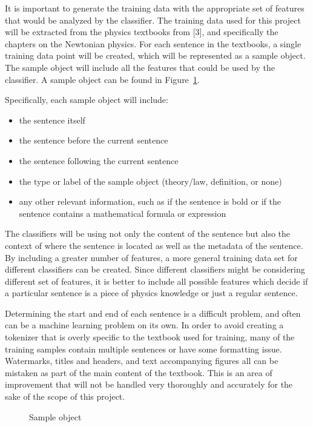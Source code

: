 \documentclass{article} %
\begin{document}
It is important to generate the training data with the appropriate set of features that would be analyzed by the classifier. The training data used for this project will be extracted from the physics textbooks from [3], and specifically the chapters on the Newtonian physics. For each sentence in the textbooks, a single training data point will be created, which will be represented as a sample object. The sample object will include all the features that could be used by the classifier. A sample object can be found in Figure~\ref{fig:data-example}.

Specifically, each sample object will include:
\begin{itemize}
	\item the sentence itself
	\item the sentence before the current sentence
	\item the sentence following the current sentence
	\item the type or label of the sample object (theory/law, definition, or none)
	\item any other relevant information, such as if the sentence is bold or if the sentence contains a mathematical formula or expression
\end{itemize}

The classifiers will be using not only the content of the sentence but also the context of where the sentence is located as well as the metadata of the sentence. By including a greater number of features, a more general training data set for different classifiers can be created. Since different classifiers might be considering different set of features, it is better to include all possible features which decide if a particular sentence is a piece of physics knowledge or just a regular sentence.

Determining the start and end of each sentence is a difficult problem, and often can be a machine learning problem on its own. In order to avoid creating a tokenizer that is overly specific to the textbook used for training, many of the training samples contain multiple sentences or have some formatting issue. Watermarks, titles and headers, and text accompanying figures all can be mistaken as part of the main content of the textbook. This is an area of improvement that will not be handled very thoroughly and accurately for the sake of the scope of this project.

\begin{figure}[H]
\centering
{}
\caption{Sample object}
\label{fig:data-example}
\end{figure}
\end{document}
